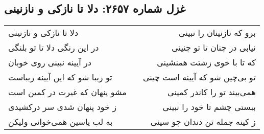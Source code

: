 \begin{center}
\section*{غزل شماره ۲۶۵۷: دلا تا نازکی و نازنینی}
\label{sec:2657}
\begin{longtable}{l p{0.5cm} r}
دلا تا نازکی و نازنینی
&&
برو که نازنینان را نبینی
\\
در این رنگی دلا تا تو بلنگی
&&
نیابی در چنان تا تو چنینی
\\
در آیینه نبینی روی خوبان
&&
که تا با خوی زشتت همنشینی
\\
تو زیبا شو که این آیینه زیباست
&&
تو بی‌چین شو که آیینه است چینی
\\
مشو پنهان که غیرت در کمین است
&&
همی‌بیند تو را کاندر کمینی
\\
ز خود پنهان شدی سر درکشیدی
&&
ببستی چشم تا خود را نبینی
\\
به لب یاسین همی‌خوانی ولیکن
&&
ز کینه جمله تن دندان چو سینی
\\
\end{longtable}
\end{center}
